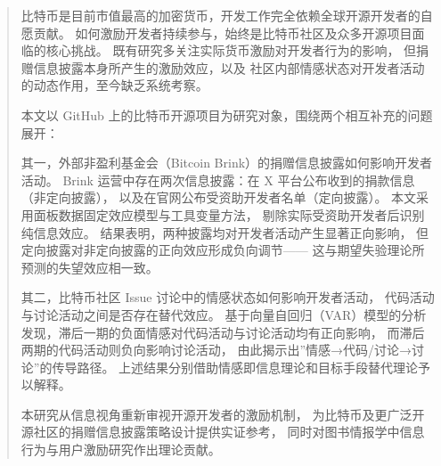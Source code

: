 \begin{abstract}
比特币是目前市值最高的加密货币，开发工作完全依赖全球开源开发者的自愿贡献。
如何激励开发者持续参与，始终是比特币社区及众多开源项目面临的核心挑战。
既有研究多关注实际货币激励对开发者行为的影响，
但捐赠信息披露本身所产生的激励效应，以及
社区内部情感状态对开发者活动的动态作用，至今缺乏系统考察。

本文以 GitHub 上的比特币开源项目为研究对象，围绕两个相互补充的问题展开：

其一，外部非盈利基金会（Bitcoin Brink）的捐赠信息披露如何影响开发者活动。
Brink 运营中存在两次信息披露：在 X 平台公布收到的捐款信息（非定向披露），
以及在官网公布受资助开发者名单（定向披露）。
本文采用面板数据固定效应模型与工具变量方法，
剔除实际受资助开发者后识别纯信息效应。
结果表明，两种披露均对开发者活动产生显著正向影响，
但定向披露对非定向披露的正向效应形成负向调节——
这与期望失验理论所预测的失望效应相一致。

其二，比特币社区 Issue 讨论中的情感状态如何影响开发者活动，
代码活动与讨论活动之间是否存在替代效应。
基于向量自回归（VAR）模型的分析发现，滞后一期的负面情感对代码活动与讨论活动均有正向影响，
而滞后两期的代码活动则负向影响讨论活动，
由此揭示出”情感→代码/讨论→讨论”的传导路径。
上述结果分别借助情感即信息理论和目标手段替代理论予以解释。

本研究从信息视角重新审视开源开发者的激励机制，
为比特币及更广泛开源社区的捐赠信息披露策略设计提供实证参考，
同时对图书情报学中信息行为与用户激励研究作出理论贡献。
\end{abstract}

